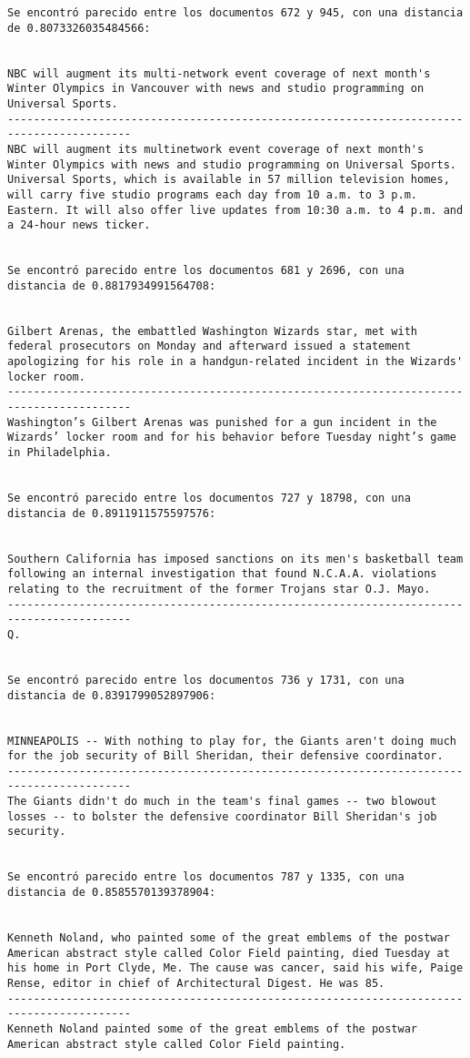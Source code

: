\documentclass[11pt]{article}
\begin{document}
\begin{Verbatim}[commandchars=\\\{\}]
Se encontró parecido entre los documentos 672 y 945, con una distancia de 0.8073326035484566:


NBC will augment its multi-network event coverage of next month's Winter Olympics in Vancouver with news and studio programming on Universal Sports.
-----------------------------------------------------------------------------------------
NBC will augment its multinetwork event coverage of next month's Winter Olympics with news and studio programming on Universal Sports. Universal Sports, which is available in 57 million television homes, will carry five studio programs each day from 10 a.m. to 3 p.m. Eastern. It will also offer live updates from 10:30 a.m. to 4 p.m. and a 24-hour news ticker.


Se encontró parecido entre los documentos 681 y 2696, con una distancia de 0.8817934991564708:


Gilbert Arenas, the embattled Washington Wizards star, met with federal prosecutors on Monday and afterward issued a statement apologizing for his role in a handgun-related incident in the Wizards' locker room.
-----------------------------------------------------------------------------------------
Washington’s Gilbert Arenas was punished for a gun incident in the Wizards’ locker room and for his behavior before Tuesday night’s game in Philadelphia.


Se encontró parecido entre los documentos 727 y 18798, con una distancia de 0.8911911575597576:


Southern California has imposed sanctions on its men's basketball team following an internal investigation that found N.C.A.A. violations relating to the recruitment of the former Trojans star O.J. Mayo.
-----------------------------------------------------------------------------------------
Q.


Se encontró parecido entre los documentos 736 y 1731, con una distancia de 0.8391799052897906:


MINNEAPOLIS -- With nothing to play for, the Giants aren't doing much for the job security of Bill Sheridan, their defensive coordinator.
-----------------------------------------------------------------------------------------
The Giants didn't do much in the team's final games -- two blowout losses -- to bolster the defensive coordinator Bill Sheridan's job security.


Se encontró parecido entre los documentos 787 y 1335, con una distancia de 0.8585570139378904:


Kenneth Noland, who painted some of the great emblems of the postwar American abstract style called Color Field painting, died Tuesday at his home in Port Clyde, Me. The cause was cancer, said his wife, Paige Rense, editor in chief of Architectural Digest. He was 85.
-----------------------------------------------------------------------------------------
Kenneth Noland painted some of the great emblems of the postwar American abstract style called Color Field painting.



\end{Verbatim}
\end{document}
